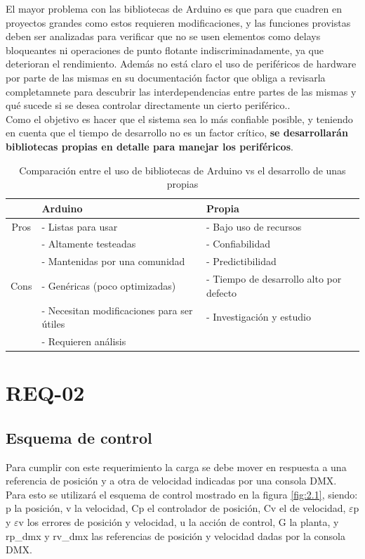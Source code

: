 El mayor problema con las bibliotecas de Arduino es que para que cuadren en proyectos grandes como estos requieren modificaciones, y las funciones provistas deben ser analizadas para verificar que no se usen elementos como delays bloqueantes ni operaciones de punto flotante indiscriminadamente, ya que deterioran el rendimiento. Además no está claro el uso de periféricos de hardware por parte de las mismas en su documentación factor que obliga a revisarla completamnete para descubrir las interdependencias entre partes de las mismas y qué sucede si se desea controlar directamente un cierto periférico.. \\
Como el objetivo es hacer que el sistema sea lo más confiable posible, y teniendo en cuenta que el tiempo de desarrollo no es un factor crítico, \textbf{se desarrollarán bibliotecas propias en detalle para manejar los periféricos}.\\

\begin{table}[!ht]
	\begin{center}
		\begin{tabular}{|c|l|l|}
			\hline
			\rowcolor{OODlightblue}
			\textbf{} & \textbf{Arduino} & \textbf{Propia} \\
			\hline \hline
			Pros & - Listas para usar & - Bajo uso de recursos \\
			& - Altamente testeadas  & - Confiabilidad \\
			& - Mantenidas por una comunidad & - Predictibilidad \\
			\hline
			Cons & - Genéricas (poco optimizadas) & - Tiempo de desarrollo alto por defecto \\
			& - Necesitan modificaciones para ser útiles & - Investigación y estudio \\
			& - Requieren análisis &   \\
			\hline
		\end{tabular}
	\end{center}
	\caption{Comparación entre el uso de bibliotecas de Arduino vs el desarrollo de unas propias}
	\label{table:\thetable}
\end{table}

\section{REQ-02} \label{sec:\thesection}
\subsection{Esquema de control}
Para cumplir con este requerimiento la carga se debe mover en respuesta a una referencia de posición y a otra de velocidad indicadas por una consola DMX. Para esto se utilizará el esquema de control mostrado en la figura \ref{fig:2.1}, siendo: p la posición, v la velocidad,  Cp el controlador de posición, Cv el de velocidad, \(\varepsilon\)p y \(\varepsilon\)v los errores de posición y velocidad, u la acción de control, G la planta, y rp\_dmx y rv\_dmx las referencias de posición y velocidad dadas por la consola DMX.

